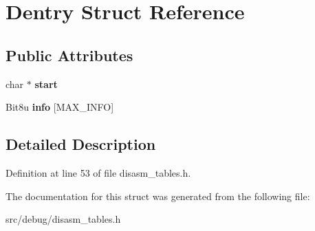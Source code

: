 \hypertarget{structDentry}{\section{Dentry Struct Reference}
\label{structDentry}
}
\subsection*{Public Attributes}
\begin{DoxyCompactItemize}
\item 
\hypertarget{structDentry_a53b01d28f6cd0941fcbc06ffe2a1d563}{char $\ast$ {\bfseries start}}\label{structDentry_a53b01d28f6cd0941fcbc06ffe2a1d563}

\item 
\hypertarget{structDentry_a08ce998885132971decf1bff17d204e1}{Bit8u {\bfseries info} \mbox{[}M\-A\-X\-\_\-\-I\-N\-F\-O\mbox{]}}\label{structDentry_a08ce998885132971decf1bff17d204e1}

\end{DoxyCompactItemize}


\subsection{Detailed Description}


Definition at line 53 of file disasm\-\_\-tables.\-h.



The documentation for this struct was generated from the following file\-:\begin{DoxyCompactItemize}
\item 
src/debug/disasm\-\_\-tables.\-h\end{DoxyCompactItemize}
